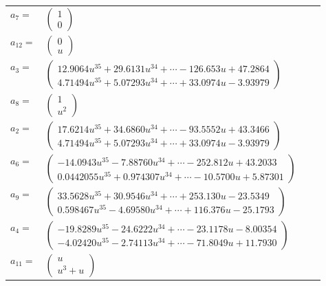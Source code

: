 \documentclass[1p]{elsarticle_modified}
\theoremstyle{definition}
\begin{document}
\begin{tabular}{m{7pt} m{180pt} m{7pt} m{180pt} }
\flushright $a_{7}=$&$\begin{pmatrix}1\\0\end{pmatrix}$ \\
\flushright $a_{12}=$&$\begin{pmatrix}0\\u\end{pmatrix}$ \\
\flushright $a_{3}=$&$\begin{pmatrix}12.9064 u^{35}+29.6131 u^{34}+\cdots-126.653 u+47.2864\\4.71494 u^{35}+5.07293 u^{34}+\cdots+33.0974 u-3.93979\end{pmatrix}$ \\
\flushright $a_{8}=$&$\begin{pmatrix}1\\u^2\end{pmatrix}$ \\
\flushright $a_{2}=$&$\begin{pmatrix}17.6214 u^{35}+34.6860 u^{34}+\cdots-93.5552 u+43.3466\\4.71494 u^{35}+5.07293 u^{34}+\cdots+33.0974 u-3.93979\end{pmatrix}$ \\
\flushright $a_{6}=$&$\begin{pmatrix}-14.0943 u^{35}-7.88760 u^{34}+\cdots-252.812 u+43.2033\\0.0442055 u^{35}+0.974307 u^{34}+\cdots-10.5700 u+5.87301\end{pmatrix}$ \\
\flushright $a_{9}=$&$\begin{pmatrix}33.5628 u^{35}+30.9546 u^{34}+\cdots+253.130 u-23.5349\\0.598467 u^{35}-4.69580 u^{34}+\cdots+116.376 u-25.1793\end{pmatrix}$ \\
\flushright $a_{4}=$&$\begin{pmatrix}-19.8289 u^{35}-24.6222 u^{34}+\cdots-23.1178 u-8.00354\\-4.02420 u^{35}-2.74113 u^{34}+\cdots-71.8049 u+11.7930\end{pmatrix}$ \\
\flushright $a_{11}=$&$\begin{pmatrix}u\\u^3+u\end{pmatrix}$ \\

\end{tabular}
\end{document}
